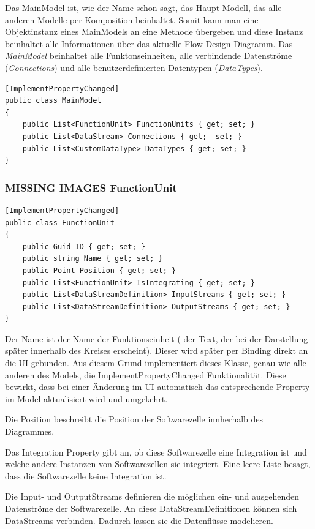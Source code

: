 Das MainModel ist, wie der Name schon sagt, das Haupt-Modell, das alle
anderen Modelle per Komposition beinhaltet. Somit kann man eine Objektinstanz
eines MainModels an eine Methode übergeben und diese Instanz beinhaltet alle
Informationen über das aktuelle Flow Design Diagramm. 
Das \textit{MainModel} beinhaltet alle Funktonseinheiten, alle verbindende
Datenströme (\textit{Connections}) und alle benutzerdefinierten Datentypen (\textit{DataTypes}).

\begin{lstlisting}[caption=MainModel Klasse]
[ImplementPropertyChanged]
public class MainModel
{
	public List<FunctionUnit> FunctionUnits { get; set; }
	public List<DataStream> Connections { get;  set; }
	public List<CustomDataType> DataTypes { get; set; } 
}
\end{lstlisting}

\subsubsection{{\bfseries\sffamily MISSING IMAGES} FunctionUnit}


\begin{lstlisting}[caption=FunctionUnit Klasse]
[ImplementPropertyChanged]
public class FunctionUnit
{
	public Guid ID { get; set; }
	public string Name { get; set; }
	public Point Position { get; set; }
	public List<FunctionUnit> IsIntegrating { get; set; }
	public List<DataStreamDefinition> InputStreams { get; set; }
	public List<DataStreamDefinition> OutputStreams { get; set; }
}
\end{lstlisting}

Der Name ist der Name der Funktionseinheit ( der Text, der bei der
Darstellung später innerhalb des Kreises erscheint). Dieser wird später per Binding
direkt an die UI gebunden. Aus diesem Grund implementiert dieses Klasse,
genau wie alle anderen des Models, die ImplementPropertyChanged
Funktionalität. Diese bewirkt, dass bei einer Änderung im UI automatisch das
entsprechende Property im Model aktualisiert wird und umgekehrt.

Die Position beschreibt die Position der Softwarezelle innherhalb des
Diagrammes.  

Das Integration Property gibt an, ob diese Softwarezelle eine Integration
ist und welche andere Instanzen von Softwarezellen sie integriert.
Eine leere Liste besagt, dass die Softwarezelle keine Integration ist.

Die Input- und OutputStreams definieren die möglichen ein- und ausgehenden
Datenströme der Softwarezelle. An diese DataStreamDefinitionen können sich DataStreams
verbinden. Dadurch lassen sie die Datenflüsse modelieren.



